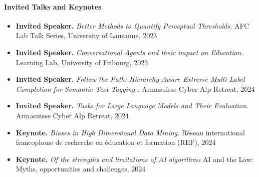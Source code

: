 
\paragraph{Invited Talks and Keynotes}
\begin{itemize}
	\item \textbf{Invited Speaker.} \textit{Better Methods to Quantify Perceptual Thresholds.} AFC Lab Talk Series, University of Lausanne, 2023
	\item \textbf{Invited Speaker.} \textit{Conversational Agents and their impact on Education.}  Learning Lab, University of Fribourg, 2023
	\item \textbf{Invited Speaker.} \textit{Follow the Path: Hierarchy-Aware Extreme Multi-Label Completion for Semantic Text Tagging .} Armasuisse Cyber Alp Retreat, 2024
	\item \textbf{Invited Speaker.} \textit{Tasks for Large Language Models and Their Evaluation.} Armasuisse Cyber Alp Retreat, 2024
	\item \textbf{Keynote.}\textit{ Biases in High Dimensional Data Mining. } Réseau international francophone de recherche en éducation et formation (REF), 2024
	\item \textbf{Keynote.}\textit{ Of the strengths and limitations of AI algorithms} AI and the Law: Myths, opportunities and challenges, 2024
\end{itemize}
